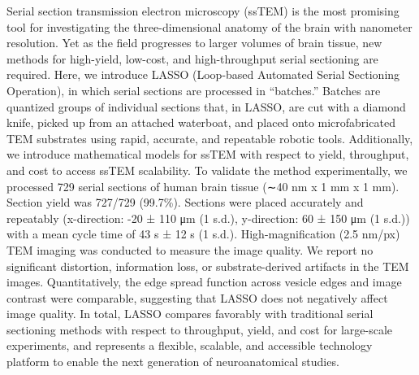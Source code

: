 \documentclass{article}
\begin{document}
Serial section transmission electron microscopy (ssTEM) is the most promising tool for investigating the three-dimensional anatomy of the brain with nanometer resolution. Yet as the field progresses to larger volumes of brain tissue, new methods for high-yield, low-cost, and high-throughput serial sectioning are required. Here, we introduce LASSO (Loop-based Automated Serial Sectioning Operation), in which serial sections are processed in “batches.” Batches are quantized groups of individual sections that, in LASSO, are cut with a diamond knife, picked up from an attached waterboat, and placed onto microfabricated TEM substrates using rapid, accurate, and repeatable robotic tools. Additionally, we introduce mathematical models for ssTEM with respect to yield, throughput, and cost to access ssTEM scalability. To validate the method experimentally, we processed 729 serial sections of human brain tissue (∼40 nm x 1 mm x 1 mm). Section yield was 727/729 (99.7\%). Sections were placed accurately and repeatably (x-direction: -20 ± 110 μm (1 s.d.), y-direction: 60 ± 150 μm (1 s.d.)) with a mean cycle time of 43 s ± 12 s (1 s.d.). High-magnification (2.5 nm/px) TEM imaging was conducted to measure the image quality. We report no significant distortion, information loss, or substrate-derived artifacts in the TEM images. Quantitatively, the edge spread function across vesicle edges and image contrast were comparable, suggesting that LASSO does not negatively affect image quality. In total, LASSO compares favorably with traditional serial sectioning methods with respect to throughput, yield, and cost for large-scale experiments, and represents a flexible, scalable, and accessible technology platform to enable the next generation of neuroanatomical studies.
\end{document}

